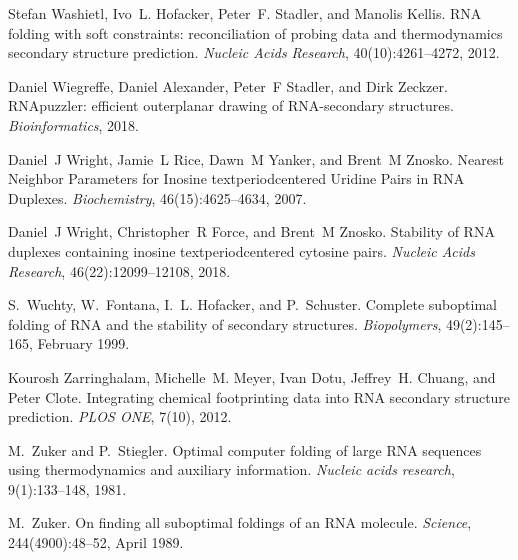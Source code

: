 \begin{DoxyDescription}
\item[\label{citelist_CITEREF_washietl:2012}%
\Hypertarget{citelist_CITEREF_washietl:2012}%
\mbox{[}29\mbox{]}]Stefan Washietl, Ivo~L. Hofacker, Peter~F. Stadler, and Manolis Kellis. RNA folding with soft constraints\+: reconciliation of probing data and thermodynamics secondary structure prediction. {\itshape Nucleic Acids Research}, 40(10)\+:4261--4272, 2012.


\item[\label{citelist_CITEREF_wiegreffe:2018}%
\Hypertarget{citelist_CITEREF_wiegreffe:2018}%
\mbox{[}30\mbox{]}]Daniel Wiegreffe, Daniel Alexander, Peter~F Stadler, and Dirk Zeckzer. RNApuzzler\+: efficient outerplanar drawing of RNA-\/secondary structures. {\itshape Bioinformatics}, 2018.


\item[\label{citelist_CITEREF_wright:2007}%
\Hypertarget{citelist_CITEREF_wright:2007}%
\mbox{[}31\mbox{]}]Daniel~J Wright, Jamie~L Rice, Dawn~M Yanker, and Brent~M Znosko. Nearest Neighbor Parameters for Inosine textperiodcentered Uridine Pairs in RNA Duplexes. {\itshape Biochemistry}, 46(15)\+:4625--4634, 2007. 


\item[\label{citelist_CITEREF_wright:2018}%
\Hypertarget{citelist_CITEREF_wright:2018}%
\mbox{[}32\mbox{]}]Daniel~J Wright, Christopher~R Force, and Brent~M Znosko. Stability of RNA duplexes containing inosine textperiodcentered cytosine pairs. {\itshape Nucleic Acids Research}, 46(22)\+:12099--12108, 2018. 


\item[\label{citelist_CITEREF_wuchty:1999}%
\Hypertarget{citelist_CITEREF_wuchty:1999}%
\mbox{[}33\mbox{]}]S.~Wuchty, W.~Fontana, I.~L. Hofacker, and P.~Schuster. Complete suboptimal folding of RNA and the stability of secondary structures. {\itshape Biopolymers}, 49(2)\+:145--165, February 1999.


\item[\label{citelist_CITEREF_zarringhalam:2012}%
\Hypertarget{citelist_CITEREF_zarringhalam:2012}%
\mbox{[}34\mbox{]}]Kourosh Zarringhalam, Michelle~M. Meyer, Ivan Dotu, Jeffrey~H. Chuang, and Peter Clote. Integrating chemical footprinting data into RNA secondary structure prediction. {\itshape PLOS ONE}, 7(10), 2012.


\item[\label{citelist_CITEREF_zuker:1981}%
\Hypertarget{citelist_CITEREF_zuker:1981}%
\mbox{[}35\mbox{]}]M.~Zuker and P.~Stiegler. Optimal computer folding of large RNA sequences using thermodynamics and auxiliary information. {\itshape Nucleic acids research}, 9(1)\+:133--148, 1981.


\item[\label{citelist_CITEREF_zuker:1989}%
\Hypertarget{citelist_CITEREF_zuker:1989}%
\mbox{[}36\mbox{]}]M.~Zuker. On finding all suboptimal foldings of an RNA molecule. {\itshape Science}, 244(4900)\+:48--52, April 1989.


\end{DoxyDescription}
